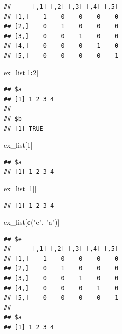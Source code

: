 \documentclass[]{book}
\newenvironment{Shaded}{\begin{snugshade}}{\end{snugshade}}
\newcommand{\KeywordTok}[1]{\textcolor[rgb]{0.13,0.29,0.53}{\textbf{#1}}}
\newcommand{\DecValTok}[1]{\textcolor[rgb]{0.00,0.00,0.81}{#1}}
\newcommand{\StringTok}[1]{\textcolor[rgb]{0.31,0.60,0.02}{#1}}
\newcommand{\CommentTok}[1]{\textcolor[rgb]{0.56,0.35,0.01}{\textit{#1}}}
\newcommand{\OperatorTok}[1]{\textcolor[rgb]{0.81,0.36,0.00}{\textbf{#1}}}
\newcommand{\NormalTok}[1]{#1}
\begin{document}
\begin{Shaded}
\end{Shaded}

\begin{verbatim}
##      [,1] [,2] [,3] [,4] [,5]
## [1,]    1    0    0    0    0
## [2,]    0    1    0    0    0
## [3,]    0    0    1    0    0
## [4,]    0    0    0    1    0
## [5,]    0    0    0    0    1
\end{verbatim}

\begin{Shaded}
\begin{Highlighting}[]
\NormalTok{ex_list[}\DecValTok{1}\OperatorTok{:}\DecValTok{2}\NormalTok{]}
\end{Highlighting}
\end{Shaded}

\begin{verbatim}
## $a
## [1] 1 2 3 4
## 
## $b
## [1] TRUE
\end{verbatim}

\begin{Shaded}
\begin{Highlighting}[]
\NormalTok{ex_list[}\DecValTok{1}\NormalTok{]}
\end{Highlighting}
\end{Shaded}

\begin{verbatim}
## $a
## [1] 1 2 3 4
\end{verbatim}

\begin{Shaded}
\begin{Highlighting}[]
\NormalTok{ex_list[[}\DecValTok{1}\NormalTok{]]}
\end{Highlighting}
\end{Shaded}

\begin{verbatim}
## [1] 1 2 3 4
\end{verbatim}

\begin{Shaded}
\begin{Highlighting}[]
\NormalTok{ex_list[}\KeywordTok{c}\NormalTok{(}\StringTok{"e"}\NormalTok{, }\StringTok{"a"}\NormalTok{)]}
\end{Highlighting}
\end{Shaded}

\begin{verbatim}
## $e
##      [,1] [,2] [,3] [,4] [,5]
## [1,]    1    0    0    0    0
## [2,]    0    1    0    0    0
## [3,]    0    0    1    0    0
## [4,]    0    0    0    1    0
## [5,]    0    0    0    0    1
## 
## $a
## [1] 1 2 3 4
\end{verbatim}
\end{document}
